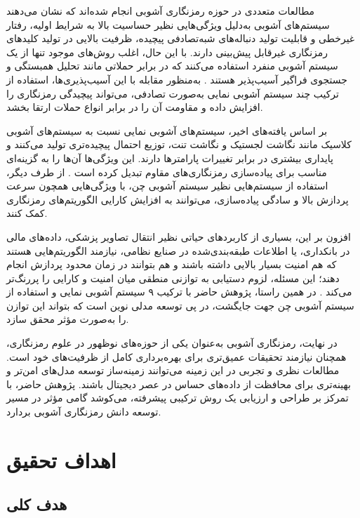 مطالعات متعددی در حوزه رمزنگاری آشوبی انجام شده‌اند که نشان می‌دهند سیستم‌های آشوبی به‌دلیل ویژگی‌هایی نظیر حساسیت بالا به شرایط اولیه، رفتار غیرخطی و قابلیت تولید دنباله‌های شبه‌تصادفی پیچیده، ظرفیت بالایی در تولید کلیدهای رمزنگاری غیرقابل پیش‌بینی دارند. با این حال، اغلب روش‌های موجود تنها از یک سیستم آشوبی منفرد استفاده می‌کنند که در برابر حملاتی مانند تحلیل همبستگی و جستجوی فراگیر آسیب‌پذیر هستند \cite{ref12}.  به‌منظور مقابله با این آسیب‌پذیری‌ها، استفاده از ترکیب چند سیستم آشوبی نمایی به‌صورت تصادفی، می‌تواند پیچیدگی رمزنگاری را افزایش داده و مقاومت آن را در برابر انواع حملات ارتقا بخشد.

بر اساس یافته‌های اخیر، سیستم‌های آشوبی نمایی نسبت به سیستم‌های آشوبی کلاسیک مانند نگاشت لجستیک و نگاشت تنت، توزیع احتمال پیچیده‌تری تولید می‌کنند و پایداری بیشتری در برابر تغییرات پارامترها دارند. این ویژگی‌ها آن‌ها را به گزینه‌ای مناسب برای پیاده‌سازی رمزنگاری‌های مقاوم تبدیل کرده است \cite{ref5}. از طرف دیگر، استفاده از سیستم‌هایی نظیر سیستم آشوبی چن، با ویژگی‌هایی همچون سرعت پردازش بالا و سادگی پیاده‌سازی، می‌توانند به افزایش کارایی الگوریتم‌های رمزنگاری کمک کنند.

افزون بر این، بسیاری از کاربردهای حیاتی نظیر انتقال تصاویر پزشکی، داده‌های مالی در بانکداری، یا اطلاعات طبقه‌بندی‌شده در صنایع نظامی، نیازمند الگوریتم‌هایی هستند که هم امنیت بسیار بالایی داشته باشند و هم بتوانند در زمان محدود پردازش انجام دهند؛ این مسئله، لزوم دستیابی به توازنی منطقی میان امنیت و کارایی را پررنگ‌تر می‌کند \cite{ref5}. در همین راستا، پژوهش حاضر با ترکیب ۹ سیستم آشوبی نمایی و استفاده از سیستم آشوبی چن جهت جایگشت، در پی توسعه مدلی نوین است که بتواند این توازن را به‌صورت مؤثر محقق سازد.

در نهایت، رمزنگاری آشوبی به‌عنوان یکی از حوزه‌های نوظهور در علوم رمزنگاری، همچنان نیازمند تحقیقات عمیق‌تری برای بهره‌برداری کامل از ظرفیت‌های خود است. مطالعات نظری و تجربی در این زمینه می‌توانند زمینه‌ساز توسعه مدل‌های امن‌تر و بهینه‌تری برای محافظت از داده‌های حساس در عصر دیجیتال باشند. پژوهش حاضر، با تمرکز بر طراحی و ارزیابی یک روش ترکیبی پیشرفته، می‌کوشد گامی مؤثر در مسیر توسعه دانش رمزنگاری آشوبی بردارد.

\section{اهداف تحقيق}

\subsection{هدف کلی}

